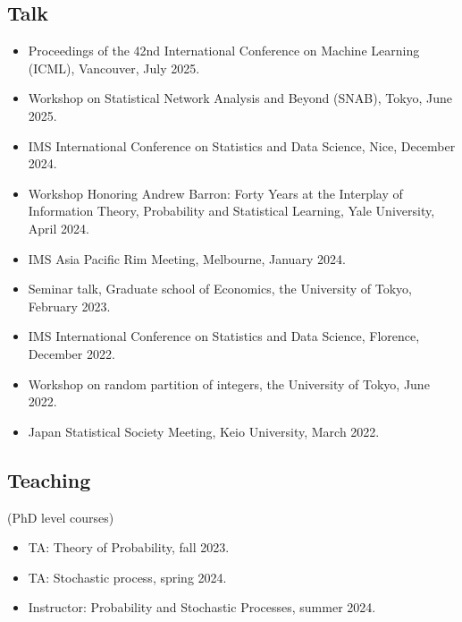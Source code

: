 \documentclass[10pt]{amsart}
\begin{document}
\subsection*{Talk}
\begin{itemize}
  \item Proceedings of the 42nd International Conference on Machine Learning (ICML), Vancouver, July 2025.
  \item  Workshop on Statistical Network Analysis and Beyond (SNAB), Tokyo, June 2025.
  \item  IMS International Conference on Statistics and Data Science, Nice, December 2024. 
  \item  Workshop Honoring Andrew Barron: Forty Years at the Interplay of Information Theory, Probability and Statistical Learning, Yale University, April 2024. 
  \item IMS Asia Pacific Rim Meeting, Melbourne, January 2024. 
  \item Seminar talk, Graduate school of Economics, the University of Tokyo, February 2023. 
  \item IMS International Conference on Statistics and Data Science, Florence, December 2022.
  \item  Workshop on random partition of integers, the University of Tokyo, June 2022.
  \item Japan Statistical Society Meeting, Keio University, March 2022.
\end{itemize}
\subsection*{Teaching} (PhD level courses)
\begin{itemize}
\item TA: Theory of Probability, fall 2023.
\item TA: Stochastic process, spring 2024.
\item Instructor: Probability and Stochastic Processes, summer 2024.
\end{itemize}
\end{document}
